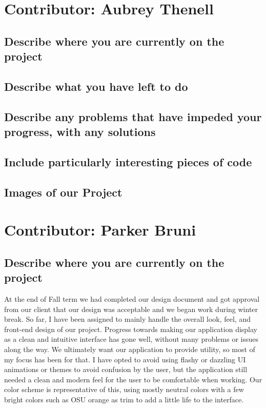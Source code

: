 \documentclass[letterpaper,10pt,serif,draftclsnofoot,onecolumn,compsoc,titlepage]{IEEEtran}
\begin{document}
\section{Contributor: Aubrey Thenell}
\subsection{Describe where you are currently on the project}
\subsection{Describe what you have left to do}
\subsection{Describe any problems that have impeded your progress, with any solutions}
\subsection{Include particularly interesting pieces of code}
\subsection{Images of our Project} 

\section{Contributor: Parker Bruni}
\subsection{Describe where you are currently on the project}
	At the end of Fall term we had completed our design document and got approval from our client that our design was acceptable and we began work during winter break.
	So far, I have been assigned to mainly handle the overall look, feel, and front-end design of our project. Progress towards making our application display as a clean and intuitive 
	interface has gone well, without many problems or issues along the way. We ultimately want our application to provide utility, so most of my focus has been for that. I have
	opted to avoid using flashy or dazzling UI animations or themes to avoid confusion by the user, but the application still needed a clean and modern feel for the user to be 
	comfortable when working. Our color scheme is representative of this, using mostly neutral colors with a few bright colors such as OSU orange as trim to add a little life 
	to the interface. 
	
\end{document}

